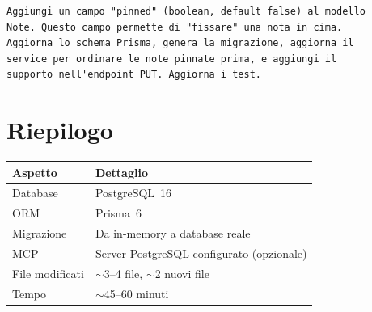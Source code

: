 \begin{praticabox}[title={Pratica --- Aggiungere un campo}]
\begin{lstlisting}[language={}]
Aggiungi un campo "pinned" (boolean, default false) al modello
Note. Questo campo permette di "fissare" una nota in cima.
Aggiorna lo schema Prisma, genera la migrazione, aggiorna il
service per ordinare le note pinnate prima, e aggiungi il
supporto nell'endpoint PUT. Aggiorna i test.
\end{lstlisting}
\end{praticabox}

\section*{Riepilogo}

\begin{center}
\begin{tabularx}{\textwidth}{l X}
\toprule
\textbf{Aspetto} & \textbf{Dettaglio} \\
\midrule
Database & PostgreSQL~16 \\
ORM & Prisma~6 \\
Migrazione & Da in-memory a database reale \\
MCP & Server PostgreSQL configurato (opzionale) \\
File modificati & $\sim$3--4 file, $\sim$2 nuovi file \\
Tempo & $\sim$45--60 minuti \\
\bottomrule
\end{tabularx}
\end{center}
